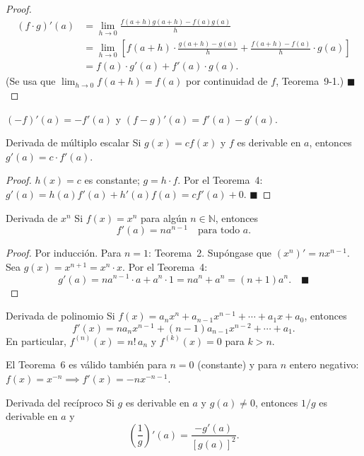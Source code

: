 \documentclass[12pt]{article}
\begin{document}
\begin{proof}
\begin{align*}
(f\cdot g)'(a) &= \lim_{h\to 0}\frac{f(a+h)g(a+h)-f(a)g(a)}{h} \\
&= \lim_{h\to 0}\left[f(a+h)\cdot\frac{g(a+h)-g(a)}{h} + \frac{f(a+h)-f(a)}{h}\cdot g(a)\right] \\
&= f(a)\cdot g'(a) + f'(a)\cdot g(a).
\end{align*}
(Se usa que $\lim_{h\to 0}f(a+h) = f(a)$ por continuidad de $f$, Teorema~9-1.)
$\blacksquare$
\end{proof}

\begin{corolario}[]{}
$(-f)'(a) = -f'(a)$ y $(f-g)'(a) = f'(a)-g'(a)$.
\end{corolario}

\begin{teorema}[5]{Derivada de múltiplo escalar}
Si $g(x) = cf(x)$ y $f$ es derivable en $a$, entonces $g'(a) = c\cdot f'(a)$.
\end{teorema}

\begin{proof}
$h(x) = c$ es constante; $g = h\cdot f$. Por el Teorema~4: $g'(a) = h(a)f'(a)+h'(a)f(a) = cf'(a)+0$.
$\blacksquare$
\end{proof}

\begin{teorema}[6]{Derivada de $x^n$}
Si $f(x) = x^n$ para algún $n \in \mathbb{N}$, entonces
\[ f'(a) = na^{n-1} \quad \text{para todo } a. \]
\end{teorema}

\begin{proof}
Por inducción. Para $n=1$: Teorema~2. Supóngase que $(x^n)' = nx^{n-1}$. Sea $g(x) = x^{n+1} = x^n \cdot x$. Por el Teorema~4:
\[ g'(a) = na^{n-1}\cdot a + a^n\cdot 1 = na^n + a^n = (n+1)a^n. \quad \blacksquare \]
\end{proof}

\begin{corolario}[]{Derivada de polinomio}
Si $f(x) = a_n x^n + a_{n-1}x^{n-1} + \cdots + a_1 x + a_0$, entonces
\[ f'(x) = na_n x^{n-1} + (n-1)a_{n-1}x^{n-2} + \cdots + a_1. \]
En particular, $f^{(n)}(x) = n!\,a_n$ y $f^{(k)}(x)=0$ para $k>n$.

El Teorema~6 es válido también para $n=0$ (constante) y para $n$ entero negativo: $f(x)=x^{-n} \implies f'(x) = -nx^{-n-1}$.
\end{corolario}

\begin{teorema}[7]{Derivada del recíproco}
Si $g$ es derivable en $a$ y $g(a) \neq 0$, entonces $1/g$ es derivable en $a$ y
\[ \left(\frac{1}{g}\right)'(a) = \frac{-g'(a)}{[g(a)]^2}. \]
\end{teorema}
\end{document}
